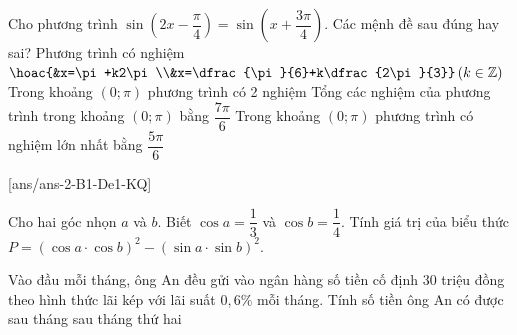 \begin{ex}%
	Cho phương trình $\sin \left(2x-\dfrac{\pi}{4}\right)=\sin \left(x+\dfrac{3\pi}{4}\right)$. Các mệnh đề sau đúng hay sai?
	\choiceTF
	{\True Phương trình có nghiệm $\hoac{&x=\pi+k2\pi\\&x=\dfrac{\pi}{6}+k\dfrac{2\pi}{3}}\,(k\in \mathbb{Z})$}
	{\True Trong khoảng $(0;\pi)$ phương trình có 2 nghiệm}
	{Tổng các nghiệm của phương trình trong khoảng $(0;\pi)$ bằng $\dfrac{7\pi}{6}$}
	{\True Trong khoảng $(0;\pi)$ phương trình có nghiệm lớn nhất bằng $\dfrac{5\pi}{6}$}
\end{ex}
[ans/ans-2-B1-De1-KQ]
\caukq
\begin{ex}%
	Cho hai góc nhọn $a$ và $b$. Biết $\cos a =\dfrac{1}{3}$ và $\cos b=\dfrac{1}{4}$. Tính giá trị của biểu thức $P=(\cos a \cdot \cos b)^2-(\sin a \cdot \sin b)^2$.
\end{ex}

\begin{ex}%
	Vào đầu mỗi tháng, ông An đều gửi vào ngân hàng số tiền cố định $30$ triệu đồng theo hình thức lãi kép với lãi suất $0{,}6\%$ mỗi tháng. Tính số tiền ông An có được sau tháng sau tháng thứ hai
\end{ex}

